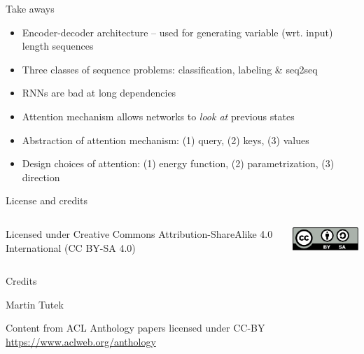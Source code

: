 \documentclass[12pt,aspectratio=169,handout]{beamer}
\begin{document}
\begin{frame}{Take aways}
	
\begin{itemize}
	\item Encoder-decoder architecture -- used for generating variable (wrt. input) length sequences
	\item Three classes of sequence problems: classification, labeling \& seq2seq
	\item RNNs are bad at long dependencies
	\item Attention mechanism allows networks to \textit{look at} previous states
	\item Abstraction of attention mechanism: (1) query, (2) keys, (3) values
	\item Design choices of attention: (1) energy function, (2) parametrization, (3) direction
\end{itemize}
	
\end{frame}



\begin{frame}{License and credits}

	\begin{columns}
		\begin{column}{0.7\textwidth}
			Licensed under Creative Commons Attribution-ShareAlike 4.0 International (CC BY-SA 4.0)
		\end{column}
		\begin{column}{0.2\textwidth}
			\includegraphics[width=0.9\linewidth]{img/cc-by-sa-icon.pdf}
		\end{column}
	\end{columns}
	
	\bigskip
	
	Credits
	
	\begin{scriptsize}
		
		Martin Tutek
		
		Content from ACL Anthology papers licensed under CC-BY \url{https://www.aclweb.org/anthology}
		
	
	\end{scriptsize}
	
\end{frame}
\end{document}
